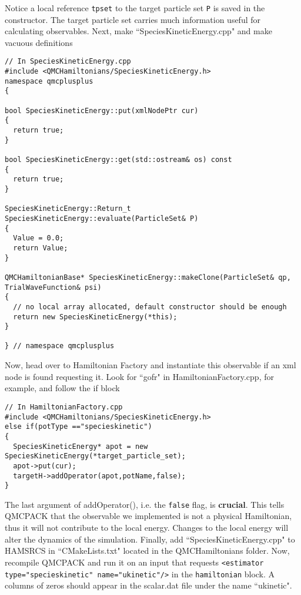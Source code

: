 Notice a local reference \verb|tpset| to the target particle set \verb|P| is saved in the constructor. The target particle set carries much information useful for calculating observables. Next, make ``SpeciesKineticEnergy.cpp" and make vacuous definitions
\begin{lstlisting}[style=C++]
// In SpeciesKineticEnergy.cpp
#include <QMCHamiltonians/SpeciesKineticEnergy.h>
namespace qmcplusplus
{

bool SpeciesKineticEnergy::put(xmlNodePtr cur)
{
  return true;
} 

bool SpeciesKineticEnergy::get(std::ostream& os) const
{ 
  return true;
}

SpeciesKineticEnergy::Return_t SpeciesKineticEnergy::evaluate(ParticleSet& P)
{
  Value = 0.0;
  return Value;
}

QMCHamiltonianBase* SpeciesKineticEnergy::makeClone(ParticleSet& qp, TrialWaveFunction& psi)
{
  // no local array allocated, default constructor should be enough
  return new SpeciesKineticEnergy(*this);
}

} // namespace qmcplusplus
\end{lstlisting}

Now, head over to Hamiltonian Factory and instantiate this observable if an xml node is found requesting it. Look for ``gofr" in HamiltonianFactory.cpp, for example, and follow the if block
\begin{lstlisting}[style=C++]
// In HamiltonianFactory.cpp
#include <QMCHamiltonians/SpeciesKineticEnergy.h>
else if(potType =="specieskinetic")
{        
  SpeciesKineticEnergy* apot = new SpeciesKineticEnergy(*target_particle_set);
  apot->put(cur);
  targetH->addOperator(apot,potName,false);
}
\end{lstlisting}
The last argument of addOperator(), i.e. the \verb|false| flag, is \textbf{crucial}. This tells QMCPACK that the observable we implemented is not a physical Hamiltonian, thus it will not contribute to the local energy. Changes to the local energy will alter the dynamics of the simulation. Finally, add ``SpeciesKineticEnergy.cpp" to HAMSRCS in ``CMakeLists.txt" located in the QMCHamiltonians folder. Now, recompile QMCPACK and run it on an input that requests \verb|<estimator type="specieskinetic" name="ukinetic"/>| in the \verb|hamiltonian| block. A columns of zeros should appear in the scalar.dat file under the name ``ukinetic".

